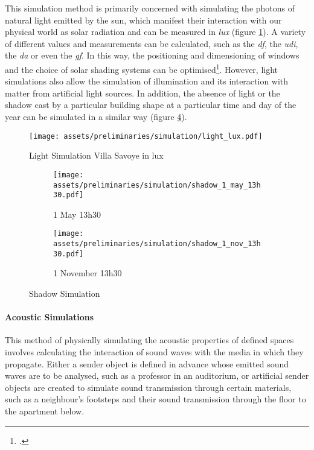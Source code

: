 \documentclass[a4paper, 12pt]{report}
\begin{document}
This simulation method is primarily concerned with simulating the photons of natural light emitted by the sun, which manifest their interaction with our physical world as solar radiation and can be measured in \textit{lux} (figure \ref{fig:light-simulation-lux-villa-savoye}). A variety of different values and measurements can be calculated, such as the \textit{\acrfull{df}}, the \textit{\acrfull{udi}}, the \textit{\acrfull{da}} or even the \textit{\acrfull{gf}}. In this way, the positioning and dimensioning of windows and the choice of solar shading systems can be optimised\footcite{aksin2021use}. However, light simulations also allow the simulation of illumination and its interaction with matter from artificial light sources. In addition, the absence of light or the shadow cast by a particular building shape at a particular time and day of the year can be simulated in a similar way (figure \ref{fig:shadow-simulation}).

\begin{figure}
\centering
\texttt{[image: assets/preliminaries/simulation/light\_lux.pdf]}
\caption{Light Simulation Villa Savoye in lux}
\label{fig:light-simulation-lux-villa-savoye}
\end{figure}

\begin{figure}
\centering
\begin{subfigure}{.5\textwidth}
\centering
\texttt{[image: assets/preliminaries/simulation/shadow\_1\_may\_13h30.pdf]}
\caption{1 May 13h30}
\label{fig:1-may-13h30}
\end{subfigure}%
\begin{subfigure}{.5\textwidth}
\centering
\texttt{[image: assets/preliminaries/simulation/shadow\_1\_nov\_13h30.pdf]}
\caption{1 November 13h30}
\label{fig:1-november-13h30}
\end{subfigure}
\caption{Shadow Simulation}
\label{fig:shadow-simulation}
\end{figure}

\paragraph{Acoustic Simulations}\label{par:acoustic-simulations}

This method of physically simulating the acoustic properties of defined spaces involves calculating the interaction of sound waves with the media in which they propagate. Either a sender object is defined in advance whose emitted sound waves are to be analysed, such as a professor in an auditorium, or artificial sender objects are created to simulate sound transmission through certain materials, such as a neighbour's footsteps and their sound transmission through the floor to the apartment below.
\end{document}
